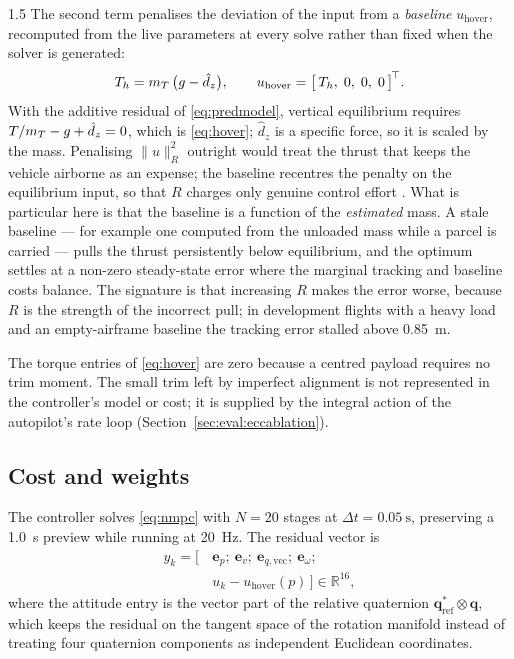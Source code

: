 \begin{spacing}{1.5}
The second term penalises the deviation of the input from a \emph{baseline}
$u_{\mathrm{hover}}$, recomputed from the live parameters at every solve rather
than fixed when the solver is generated:
\begin{equation}
T_h = m_T\,\bigl(g - \hat d_z\bigr),
\qquad
u_{\mathrm{hover}} = \bigl[\, T_h,\; 0,\; 0,\; 0 \,\bigr]^{\!\top}.
\label{eq:hover}
\end{equation}
With the additive residual of \eqref{eq:predmodel}, vertical equilibrium requires
$T/m_T - g + \hat d_z = 0$, which is \eqref{eq:hover}; $\hat d_z$ is a specific
force, so it is scaled by the mass. Penalising $\|u\|^2_R$ outright would treat
the thrust that keeps the vehicle airborne as an expense; the baseline recentres
the penalty on the equilibrium input, so that $R$ charges only genuine control
effort \cite{rawlings2017mpc}. What is particular here is that the baseline is a
function of the \emph{estimated} mass. A stale baseline --- for example one
computed from the unloaded mass while a parcel is carried --- pulls the thrust
persistently below equilibrium, and the optimum settles at a non-zero
steady-state error where the marginal tracking and baseline costs balance. The
signature is that increasing $R$ makes the error worse, because $R$ is the
strength of the incorrect pull; in development flights with a heavy load and an
empty-airframe baseline the tracking error stalled above \SI{0.85}{\meter}.

The torque entries of \eqref{eq:hover} are zero because a centred payload
requires no trim moment. The small trim left by imperfect alignment is not
represented in the controller's model or cost; it is supplied by the integral
action of the autopilot's rate loop (Section~\ref{sec:eval:eccablation}).

\subsection{Cost and weights}\label{sec:frame:nmpcweights}

The controller solves \eqref{eq:nmpc} with $N=20$ stages at
$\Delta t=\SI{0.05}{\second}$, preserving a \SI{1.0}{\second} preview while
running at \SI{20}{\hertz}. The residual vector is
\begin{equation}
\begin{aligned}
y_k = \bigl[\, &\bm e_p;\ \bm e_v;\ \bm e_{q,\mathrm{vec}};\ \bm e_\omega;\\
&u_k - u_{\mathrm{hover}}(p) \,\bigr] \in \mathbb{R}^{16},
\end{aligned}
\label{eq:nmpcresidual}
\end{equation}
where the attitude entry is the vector part of the relative quaternion
$\bm q_{\mathrm{ref}}^{*}\otimes\bm q$, which keeps the residual on the tangent
space of the rotation manifold instead of treating four quaternion components as
independent Euclidean coordinates.


\end{spacing}
